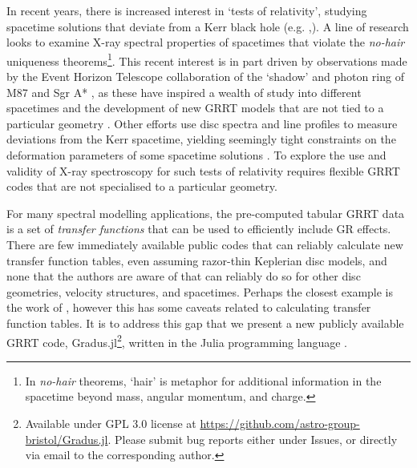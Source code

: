 \documentclass[fleqn,usenatbib]{mnras}
\newcommand{\software}[1]{{\sc #1}}
\newcommand{\Gradus}{\software{Gradus.jl}\xspace}
\begin{document}
In recent years, there is increased interest in `tests of relativity', studying
spacetime solutions that deviate from a Kerr black hole (e.g.
\citealt{johannsen_testing_2010, chrusciel_stationary_2012, bambi_testing_2022,
patra_accretion_2023, chen_observational_2024},). A line of research looks to
examine X-ray spectral properties of spacetimes that violate the
\textit{no-hair} uniqueness theorems\footnote{In \emph{no-hair} theorems, `hair'
    is metaphor for additional information in the spacetime beyond mass, angular
momentum, and charge.}. This recent interest is in part driven by observations
made by the Event Horizon Telescope collaboration of the `shadow' and photon
ring of M87 and Sgr A* \citep{the_event_horizon_telescope_collaboration_first_2019,
the_event_horizon_telescope_collaboration_first_2023}, as these have inspired a
wealth of study into different spacetimes and the development of new GRRT models
that are not tied to a particular geometry
\citep[see e.g.][]{eht_non_kerr_2022}. Other efforts use disc spectra and line
profiles to measure deviations from the Kerr spacetime, yielding seemingly tight
constraints on the deformation parameters of some spacetime solutions
\citep[e.g.][]{bambi_precision_measuremets_2021}. To explore the use and
validity of X-ray spectroscopy for such tests of relativity requires flexible
GRRT codes that are not specialised to a particular geometry.

For many spectral modelling applications, the pre-computed tabular GRRT data is a
set of \textit{transfer functions} that can be used to efficiently include
GR effects. There are few immediately available public codes that can reliably
calculate new transfer function tables, even assuming razor-thin Keplerian
disc models, and none that the authors are aware of that can reliably do so for
other disc geometries, velocity structures, and spacetimes. Perhaps the closest
example is the work of \citep{taylor_exploring_2018}, however this has some
caveats related to calculating transfer function tables. It is to address this
gap that we present a new publicly available GRRT code,
\Gradus\footnote{Available under GPL 3.0 license at
\url{https://github.com/astro-group-bristol/Gradus.jl}. Please submit bug
reports either under Issues, or directly via email to the corresponding
author.}, written in the Julia programming language
\citep{Bezanson_Julia_A_fresh_2017}.
\end{document}
